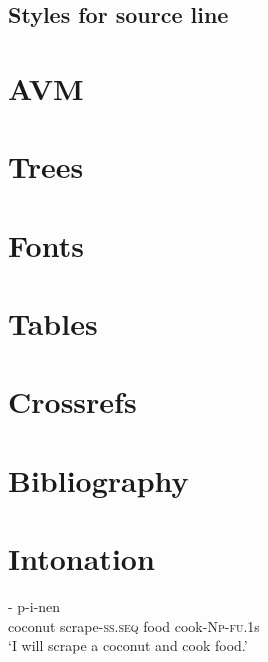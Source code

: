 \documentclass[biblatex]{LSP/langsci}
\begin{document}
\subsection{Styles for source line}



% 
% 
% 
% 


\section{AVM}
\section{Trees}
\section{Fonts}


\section{Tables}\label{sec:tables}

\section{Crossrefs}

\section{Bibliography}
 
\section{Intonation}
\ea  
\gll
{}%
%
%
- %
%
p-i-nen \\
coconut  scrape-\textsc{ss.seq} food  cook-\textsc{Np-fu}.1s      \\
\glt`I will scrape a coconut and cook food.'
\z
\end{document}
